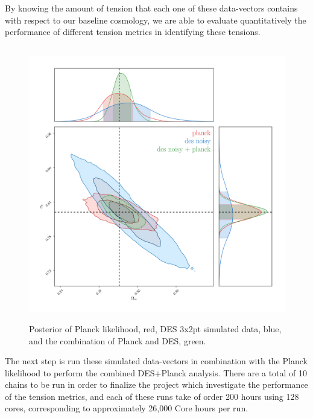 \documentclass[12pt]{article}
\begin{document}
\begin{small}
By knowing the amount of tension that each one of these data-vectors contains with respect to our baseline cosmology, we are able to evaluate quantitatively the performance of different tension metrics in identifying these tensions.


\begin{figure}[h!]
\begin{center}
\includegraphics[height=12cm]{des+planck_poly2D.png}
\end{center}
 \caption{Posterior of Planck likelihood, red, DES 3x2pt simulated data, blue, and the combination of Planck and DES, green.}
\label{figure1}
\end{figure}

The next step is run these simulated data-vectors in combination with the Planck likelihood to perform the combined DES+Planck analysis. There are a total of 10 chains to be run in order to finalize the project which investigate the performance of the tension metrics, and each of these runs take of order 200 hours using 128 cores, corresponding to approximately 26,000 Core hours per run.


\end{small}
\end{document}
